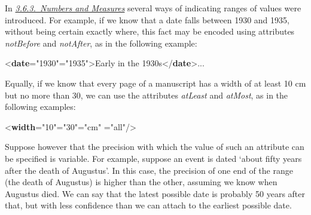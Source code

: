 In \textit{\hyperref[CONANU]{3.6.3.\ Numbers and Measures}} several ways of indicating ranges of values were introduced. For example, if we know that a date falls between 1930 and 1935, without being certain exactly where, this fact may be encoded using attributes {\itshape notBefore} and {\itshape notAfter}, as in the following example: \par\bgroup{}\exampleFont \begin{shaded}\noindent\mbox{}{<\textbf{date}\hspace*{1em}{notBefore}="{1930}"\hspace*{1em}{notAfter}="{1935}">}Early in the 1930s{</\textbf{date}>}...\end{shaded}\egroup\par \noindent  Equally, if we know that every page of a manuscript has a width of at least 10 cm but no more than 30, we can use the attributes {\itshape atLeast} and {\itshape atMost}, as in the following examples: \par\bgroup{}\exampleFont \begin{shaded}\noindent\mbox{}{<\textbf{width}\hspace*{1em}{atLeast}="{10}"\hspace*{1em}{atMost}="{30}"\hspace*{1em}{unit}="{cm}"\mbox{}\newline 
\hspace*{1em}{scope}="{all}"/>}\end{shaded}\egroup\par \par
Suppose however that the precision with which the value of such an attribute can be specified is variable. For example, suppose an event is dated ‘about fifty years after the death of Augustus’. In this case, the precision of one end of the range (the death of Augustus) is higher than the other, assuming we know when Augustus died. We can say that the latest possible date is probably 50 years after that, but with less confidence than we can attach to the earliest possible date.\par
